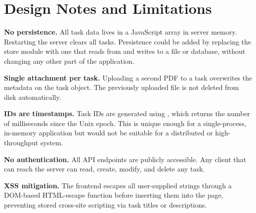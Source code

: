 \documentclass[11pt,a4paper]{article}
\newcommand{\code}[1]{%
  \tcbox[colback=SoftGray,colframe=Border,boxrule=0.4pt,arc=2pt,boxsep=0.45mm,left=1mm,right=1mm,top=0.6mm,bottom=0.6mm]{\texttt{\small#1}}%
}
\begin{document}
\section{Design Notes and Limitations}

\textbf{No persistence.} All task data lives in a JavaScript array in server
memory. Restarting the server clears all tasks. Persistence could be added by
replacing the store module with one that reads from and writes to a file or
database, without changing any other part of the application.

\textbf{Single attachment per task.} Uploading a second PDF to a task
overwrites the \code{attachment} metadata on the task object. The previously
uploaded file is not deleted from disk automatically.

\textbf{IDs are timestamps.} Task IDs are generated using \code{Date.now()},
which returns the number of milliseconds since the Unix epoch. This is unique
enough for a single-process, in-memory application but would not be suitable
for a distributed or high-throughput system.

\textbf{No authentication.} All API endpoints are publicly accessible. Any
client that can reach the server can read, create, modify, and delete any task.

\textbf{XSS mitigation.} The frontend escapes all user-supplied strings through
a DOM-based HTML-escape function before inserting them into the page, preventing
stored cross-site scripting via task titles or descriptions.
\end{document}
